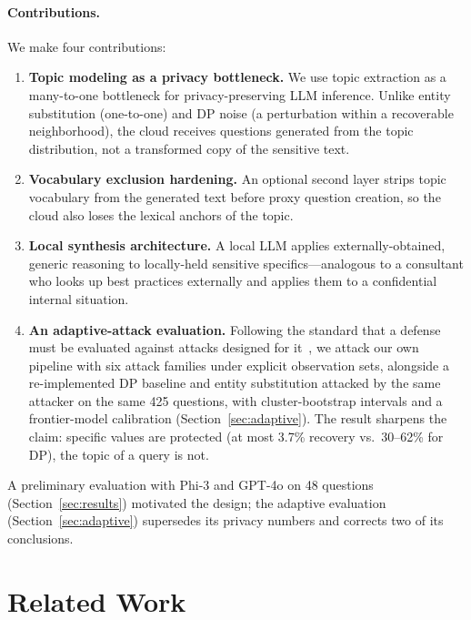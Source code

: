 \documentclass[sigconf,balance=false]{acmart}
\begin{document}
\paragraph{Contributions.} We make four contributions:

\begin{enumerate}
\item \textbf{Topic modeling as a privacy bottleneck.} We use topic extraction as a many-to-one bottleneck for privacy-preserving LLM inference. Unlike entity substitution (one-to-one) and DP noise (a perturbation within a recoverable neighborhood), the cloud receives questions generated from the topic distribution, not a transformed copy of the sensitive text.

\item \textbf{Vocabulary exclusion hardening.} An optional second layer strips topic vocabulary from the generated text before proxy question creation, so the cloud also loses the lexical anchors of the topic.

\item \textbf{Local synthesis architecture.} A local LLM applies externally-obtained, generic reasoning to locally-held sensitive specifics---analogous to a consultant who looks up best practices externally and applies them to a confidential internal situation.

\item \textbf{An adaptive-attack evaluation.} Following the standard that a defense must be evaluated against attacks designed for it~\cite{carlini2019evaluating,tramer2020adaptive}, we attack our own pipeline with six attack families under explicit observation sets, alongside a re-implemented DP baseline and entity substitution attacked by the same attacker on the same 425 questions, with cluster-bootstrap intervals and a frontier-model calibration (Section~\ref{sec:adaptive}). The result sharpens the claim: specific values are protected (at most 3.7\% recovery vs.\ 30--62\% for DP), the topic of a query is not.
\end{enumerate}

A preliminary evaluation with Phi-3 and GPT-4o on 48 questions (Section~\ref{sec:results}) motivated the design; the adaptive evaluation (Section~\ref{sec:adaptive}) supersedes its privacy numbers and corrects two of its conclusions.

\section{Related Work}
\label{sec:related}
\end{document}
